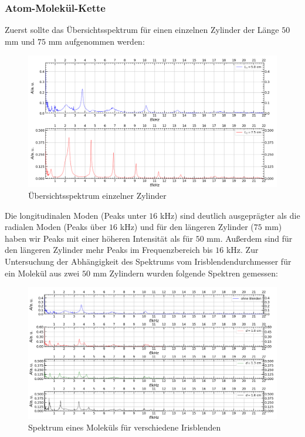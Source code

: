 \documentclass[german,  %
parskip=full,  %
]{scrartcl}
\begin{document}
\subsubsection{Atom-Molekül-Kette}
Zuerst sollte das Übersichtsspektrum für einen einzelnen Zylinder der Länge $50$ mm und $75$ mm aufgenommen werden:
\newpage
\begin{figure}[h!]
\centering
\includegraphics[width=\textwidth]{4621.png}
\caption{Übersichtsspektrum einzelner Zylinder}
\end{figure}
Die longitudinalen Moden (Peaks unter $16$ kHz) sind deutlich ausgeprägter als die radialen Moden (Peaks über $16$ kHz) und für den längeren Zylinder ($75$ mm) haben wir Peaks mit einer höheren Intensität als für $50$ mm. Außerdem sind für den längeren Zylinder mehr Peaks im Frequenzbereich bis $16$ kHz.
Zur Untersuchung der Abhängigkeit des Spektrums vom Irisblendendurchmesser für ein Molekül aus zwei $50$ mm Zylindern wurden folgende Spektren gemessen:
\newpage
\begin{figure}[h!]
\centering
\includegraphics[width=\textwidth]{4622_und_4623.png}
\caption{Spektrum eines Moleküls für verschiedene Irisblenden}
\end{figure}
\end{document}
